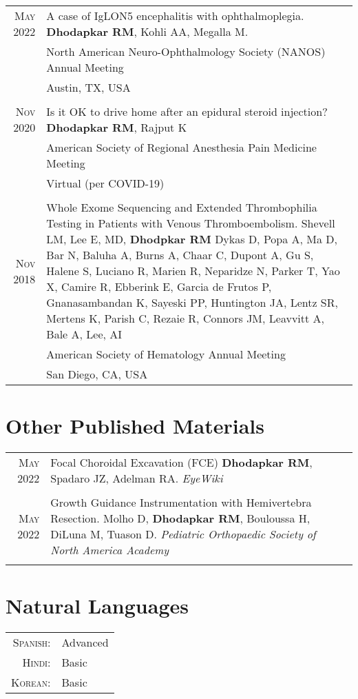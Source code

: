 \documentclass[a4paper,10pt]{article}
\begin{document}
\begin{tabular}{rp{11cm}}
 \textsc{May} 2022 & A case of IgLON5 encephalitis with ophthalmoplegia. {\bf Dhodapkar RM}, Kohli AA, Megalla M. \\
 								 & North American Neuro-Ophthalmology Society (NANOS) Annual Meeting \\
 								 & Austin, TX, USA  \\
 \multicolumn{2}{c}{} \\
 \textsc{Nov} 2020 & Is it OK to drive home after an epidural steroid injection? {\bf Dhodapkar RM}, Rajput K \\
 								 & American Society of Regional Anesthesia Pain Medicine Meeting \\
 								 & Virtual (per COVID-19)  \\ 
 \multicolumn{2}{c}{} \\
 \textsc{Nov} 2018 & Whole Exome Sequencing and Extended Thrombophilia Testing in Patients with Venous Thromboembolism.  Shevell LM, Lee E, MD, {\bf Dhodpkar RM} Dykas D, Popa A, Ma D, Bar N, Baluha A, Burns A, Chaar C, Dupont A, Gu S, Halene S, Luciano R, Marien R, Neparidze N, Parker T, Yao X, Camire R, Ebberink E, Garcia de Frutos P, Gnanasambandan K, Sayeski PP, Huntington JA, Lentz SR, Mertens K, Parish C, Rezaie R, Connors JM, Leavvitt A, Bale A, Lee, AI \\
 								 & American Society of Hematology Annual Meeting \\
 								 & San Diego, CA, USA\\
\end{tabular}


\section{Other Published Materials}
\begin{tabular}{rp{11cm}}
 \textsc{May} 2022 &  Focal Choroidal Excavation (FCE) {\bf Dhodapkar RM}, Spadaro JZ, Adelman RA. {\it EyeWiki} \\
 \multicolumn{2}{c}{} \\
 \textsc{May} 2022 &  Growth Guidance Instrumentation with Hemivertebra Resection.  Molho D, {\bf Dhodapkar RM}, Bouloussa H, DiLuna M, Tuason D. {\it Pediatric Orthopaedic Society of North America Academy} \\
 \multicolumn{2}{c}{}
\end{tabular}

\section{Natural Languages}
\begin{tabular}{rl}
\textsc{Spanish:}&Advanced\\
\textsc{Hindi:}&Basic\\
\textsc{Korean:}&Basic\\
\end{tabular}
\end{document}

